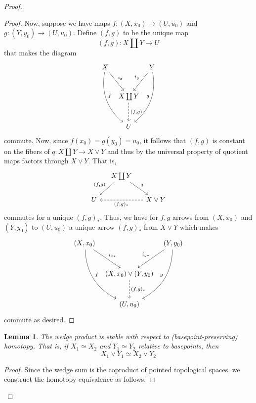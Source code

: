 \documentclass[fontsize=11pt]{scrartcl} %
\numberwithin{equation}{section} %
\numberwithin{figure}{section} %
\numberwithin{table}{section} %
\newtheorem{lemma}{Lemma}
\begin{document}
\begin{proof}
\begin{proof}
    Now, suppose we have maps $f:(X,x_0)\to (U,u_0)$
    and $g:(Y,y_0)\to (U,u_0)$. Define $(f,g)$ to be the unique map
    \[
        (f,g):X\coprod Y\to U
    \]
    that makes the diagram
    \[
        \begin{tikzcd}[column sep=tiny, row sep=large]
    X\ar[dr,"i_x"]\ar[ddr, "f", bend right] &&Y\ar[dl, "i_y"']\ar[ddl,
    "g"', bend left]\\
    &X\coprod Y\ar[d,"{(f,g)}",dashed]\\
    &U
\end{tikzcd}
    \]
    commute. Now, since $f(x_0) = g(y_0) = u_0$, it follows that $(f,g)$ is
    constant on the fibers of $q:X\coprod Y\to X\vee Y$ and thus by the
    universal property of quotient maps factors through $X\vee Y$. That is,
    \[
        \begin{tikzcd}[column sep=small]
            &X\coprod Y\arrow[dl,"{(f,g)}"']\ar[dr,"q"]\\
    U &&X\vee Y\arrow[dashed]{ll}{(f,g)_*}
\end{tikzcd}
    \]
    commutes for a unique $(f,g)_*$. Thus, we have for $f,g$ arrows from
    $(X,x_0)$ and $(Y,y_0)$ to $(U,u_0)$ a unique arrow $(f,g)_*$ from $X\vee Y$
    which makes
    \[
        \begin{tikzcd}[column sep=tiny, row sep=large]
                (X,x_0)\ar[dr,"i_{x*}"]\ar[ddr,"f", bend right]
                &&(Y,y_0)\ar[dl,"i_{y*}"'] \ar[ddl,"g"', bend left]\\
                &(X,x_0)\vee (Y,y_0)\ar[d, "{(f,g)_*}",dashed]\\
                &(U,u_0)
        \end{tikzcd}
    \]
    commute as desired.
    \end{proof}

    \begin{lemma}
        The wedge product is stable with respect to (basepoint-preserving) homotopy. That is, if
        $X_1\simeq X_2$ and $Y_1\simeq Y_2$ relative to basepoints, then
        \[
            X_1\vee Y_1\simeq X_2\vee Y_2
        \]
    \end{lemma}
    \begin{proof}
        Since the wedge sum is the coproduct of pointed topological spaces, we
        construct the homotopy equivalence as follows:


\end{proof}
\end{proof}
\end{document}
